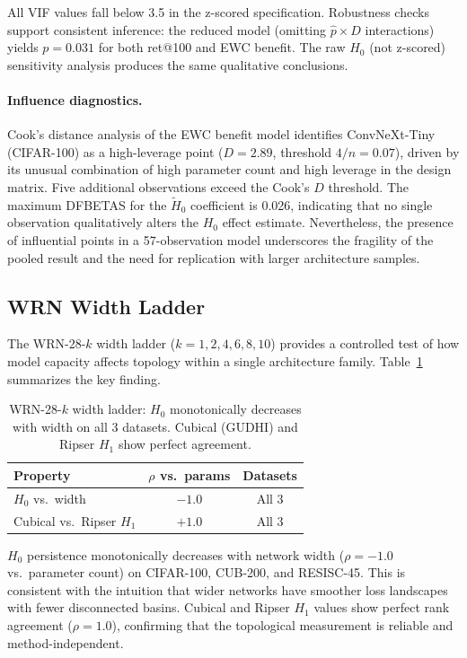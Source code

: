 \documentclass[10pt,twocolumn]{article}
\begin{document}
All VIF values fall below 3.5 in the z-scored specification. Robustness checks support consistent inference: the reduced model (omitting $\hat{p} \times D$ interactions) yields $p = 0.031$ for both ret@100 and EWC benefit. The raw $H_0$ (not z-scored) sensitivity analysis produces the same qualitative conclusions.

\paragraph{Influence diagnostics.}
Cook's distance analysis of the EWC benefit model identifies ConvNeXt-Tiny (CIFAR-100) as a high-leverage point ($D = 2.89$, threshold $4/n = 0.07$), driven by its unusual combination of high parameter count and high leverage in the design matrix. Five additional observations exceed the Cook's $D$ threshold. The maximum DFBETAS for the $\tilde{H}_0$ coefficient is 0.026, indicating that no single observation qualitatively alters the $H_0$ effect estimate. Nevertheless, the presence of influential points in a 57-observation model underscores the fragility of the pooled result and the need for replication with larger architecture samples.

\subsection{WRN Width Ladder}
\label{sec:wrn}

The WRN-28-$k$ width ladder ($k = 1, 2, 4, 6, 8, 10$) provides a controlled test of how model capacity affects topology within a single architecture family. Table~\ref{tab:wrn} summarizes the key finding.

\begin{table}[t]
\centering
\caption{WRN-28-$k$ width ladder: $H_0$ monotonically decreases with width on all 3 datasets. Cubical (GUDHI) and Ripser $H_1$ show perfect agreement.}
\label{tab:wrn}
\small
\begin{tabular}{@{}lcc@{}}
\toprule
Property & $\rho$ vs.\ params & Datasets \\
\midrule
$H_0$ vs.\ width & $-1.0$ & All 3 \\
Cubical vs.\ Ripser $H_1$ & $+1.0$ & All 3 \\
\bottomrule
\end{tabular}
\end{table}

$H_0$ persistence monotonically decreases with network width ($\rho = -1.0$ vs.\ parameter count) on CIFAR-100, CUB-200, and RESISC-45. This is consistent with the intuition that wider networks have smoother loss landscapes with fewer disconnected basins. Cubical and Ripser $H_1$ values show perfect rank agreement ($\rho = 1.0$), confirming that the topological measurement is reliable and method-independent.
\end{document}
